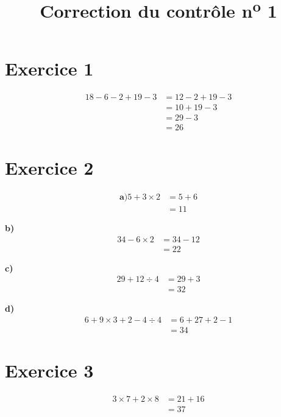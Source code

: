 \documentclass[12pt]{extarticle}
\title{\textbf{Correction du contrôle n\textsuperscript{o} 1}}
\author{}
\date{}
\begin{document}
\maketitle

\section*{Exercice 1}
\begin{align*}
18 - 6 - 2 + 19 - 3 &= 12 - 2 + 19 - 3 \\
                     &= 10 + 19 - 3 \\
                     &= 29 - 3 \\
                     &= 26
\end{align*}

\section*{Exercice 2}

\begin{align*}
\textbf{a)}
5 + 3 \times 2 &= 5 + 6 \\
               &= 11
\end{align*}

\textbf{b)}
\begin{align*}
34 - 6 \times 2 &= 34 - 12 \\
                &= 22
\end{align*}

\textbf{c)}
\begin{align*}
29 + 12 \div 4 &= 29 + 3 \\
               &= 32
\end{align*}

\textbf{d)}
\begin{align*}
6 + 9 \times 3 + 2 - 4 \div 4 &= 6 + 27 + 2 - 1 \\
                              &= 34
\end{align*}

\section*{Exercice 3}
\begin{align*}
3 \times 7 + 2 \times 8 &= 21 + 16 \\
                        &= 37
\end{align*}
\end{document}
